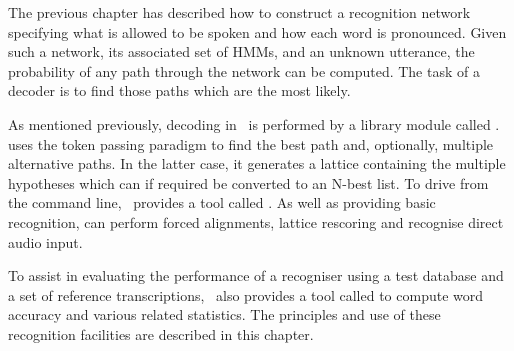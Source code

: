 
%
%


The previous chapter has described how to construct a recognition
network specifying what is allowed to be spoken and how
each word is pronounced.  Given such a network, its associated
set of HMMs, and an unknown utterance,  the probability of
any path through the network can be computed.   The task of a 
decoder is to find those paths which are the most likely.

As mentioned previously, decoding in \HTK\ is performed by a library
module called .   uses the token passing
paradigm to find the best path and, optionally, multiple alternative
paths.  In the latter case, it generates a lattice containing the
multiple hypotheses which can if required be converted to an N-best
list.  To drive  from the command line, \HTK\ provides a
tool called .  As well as providing basic recognition,
 can perform forced alignments, lattice rescoring and
recognise direct audio input.  

To assist in evaluating the performance
of a recogniser using a test database and a set of reference transcriptions, 
\HTK\ also provides a tool called  to compute word 
accuracy and various related statistics.  
The principles and use of these recognition facilities are described
in this chapter.


